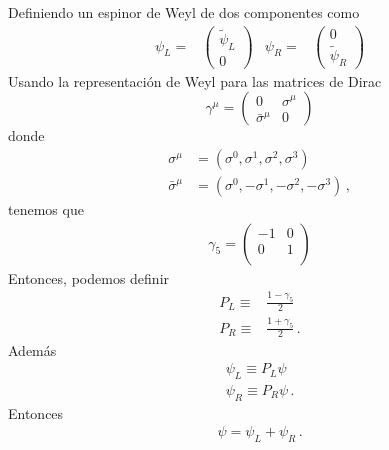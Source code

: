 Definiendo un espinor de  Weyl de dos componentes como
\begin{align*}
  \psi_L=&  \begin{pmatrix}
    \widetilde{\psi}_L\\
    0 
  \end{pmatrix}&  \psi_R=&  \begin{pmatrix}
    0\\
    \widetilde{\psi}_R
  \end{pmatrix}
\end{align*}
Usando la representación de Weyl para las matrices de Dirac
\begin{equation}
  \gamma^\mu=\begin{pmatrix}
    0&\sigma^\mu\\
    \bar{\sigma}^\mu & 0
  \end{pmatrix}
\end{equation}
donde
\begin{align}
  \sigma^\mu&=(\sigma^0,\sigma^1,\sigma^2,\sigma^3)\nonumber\\
  \bar{\sigma}^\mu&=(\sigma^0,-\sigma^1,-\sigma^2,-\sigma^3)\,,
\end{align}
tenemos que
\begin{align*}
  \gamma_5=
  \begin{pmatrix}
    -1 &0\\
    0&1\\
  \end{pmatrix}
\end{align*}
Entonces, podemos definir
\begin{align}
  P_L\equiv&\frac{1-\gamma_5}{2}\nonumber\\
  P_R\equiv&\frac{1+\gamma_5}{2}\,.
\end{align}
Además
\begin{align}
  \psi_L\equiv P_L\psi\nonumber\\
  \psi_R\equiv P_R\psi\,.
\end{align}
Entonces
\begin{align}
  \psi=\psi_L+\psi_R\,.
\end{align}

